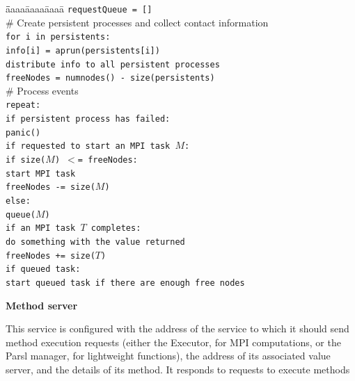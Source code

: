 \documentclass[10pt]{article}
\begin{document}
\begin{tabbing}
\=\=aaaa\=aaaa\=aaaa\=\kill
\>\> \texttt{requestQueue = []} \\
\>\> \# Create persistent processes and collect contact information \\
\>\> \texttt{for i in persistents:}\\
\>\>\> \texttt{info[i] = aprun(persistents[i])}\\
\>\> \texttt{distribute info to all persistent processes}\\
\>\> \texttt{freeNodes = numnodes() - size(persistents)}\\
\>\>\# Process events\\
\>\> \texttt{repeat:}\\
\>\>\> \texttt{if persistent process has failed:} \\
\>\>\>\> \texttt{panic()} \\
\>\>\> \texttt{if requested to start an MPI task $M$:}\\
\>\>\>\> \texttt{if size($M$) $<$= freeNodes:}\\
\>\>\>\>\> \texttt{start MPI task} \\
\>\>\>\>\> \texttt{freeNodes -= size($M$)}\\
\>\>\>\> \texttt{else:}\\
\>\>\>\>\> \texttt{queue($M$)}\\
\>\>\> \texttt{if an MPI task $T$ completes:}\\
\>\>\>\> \texttt{do something with the value returned}\\
\>\>\>\> \texttt{freeNodes += size($T$)}\\
\>\>\> \texttt{if queued task:} \\
\>\>\>\> \texttt{start queued task if there are enough free nodes}
\end{tabbing}


\vspace{3ex}
\noindent
\textbf{Method server}

\noindent
This service is configured with the address of the service to which it should send method execution requests (either the Executor, for MPI computations, or the Parsl manager, for lightweight functions), the address of its associated value server, and the details of its method. It responds to requests to execute methods 
\end{document}

